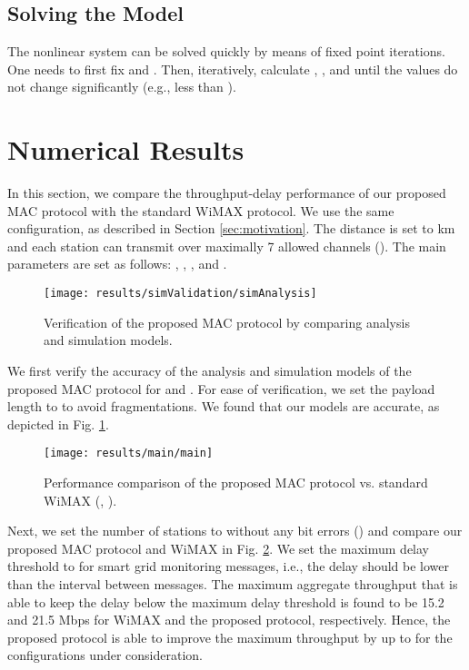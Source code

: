 \documentclass[journal,10pt,draftclsnofoot,onecolumn]{IEEEtran}
\begin{document}
\subsection{Solving the Model}

	The nonlinear system can be solved quickly by means of fixed point iterations. One needs to first fix  and . Then, iteratively, calculate , , and  until the values do not change significantly (e.g., less than ). 



\section{Numerical Results}
\label{sec:numericalResults}
	In this section, we compare the throughput-delay performance of our proposed MAC protocol with the standard WiMAX protocol. We use the same configuration, as described in Section \ref{sec:motivation}. The distance is set to  km and each station can transmit over maximally 7 allowed channels (). The main parameters are set as follows: , , , and .

\begin{figure}
\centering
\texttt{[image: results/simValidation/simAnalysis]}
\caption{Verification of the proposed MAC protocol by comparing analysis and simulation models.}
\label{fig:validation}
\end{figure}

	We first verify the accuracy of the analysis and simulation models of the proposed MAC protocol for  and . For ease of verification, we set the payload length to  to avoid fragmentations. We found that our models are accurate, as depicted in Fig. \ref{fig:validation}.

\begin{figure}
\centering
\texttt{[image: results/main/main]}
\caption{Performance comparison of the proposed MAC protocol vs. standard WiMAX (, ).}
\label{fig:mainRes}
\end{figure}

Next, we set the number of stations to  without any bit errors () and compare our proposed MAC protocol and WiMAX in Fig. \ref{fig:mainRes}. We set the maximum delay threshold to  for smart grid monitoring messages, i.e., the delay should be lower than the interval between messages. The maximum aggregate throughput that is able to keep the delay below the maximum delay threshold is found to be 15.2 and 21.5 Mbps for WiMAX and the proposed protocol, respectively. Hence, the proposed protocol is able to improve the maximum throughput by up to  for the configurations under consideration. 
\end{document}
